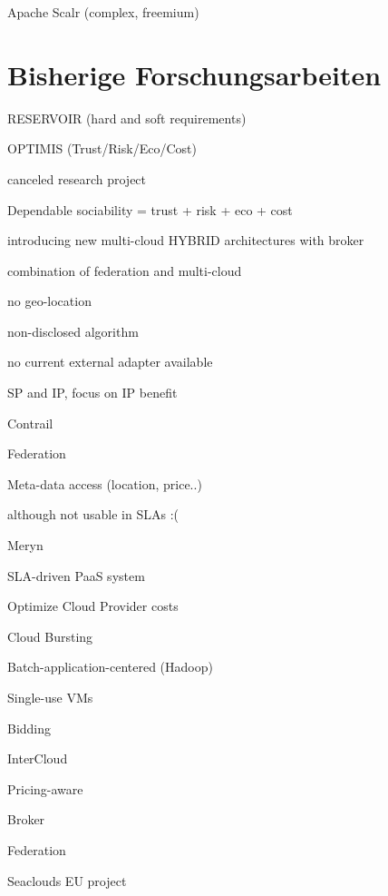 %
%
%
%
%


Apache Scalr (complex, freemium) 

\section{Bisherige Forschungsarbeiten}



RESERVOIR (hard and soft requirements) 



OPTIMIS (Trust/Risk/Eco/Cost) 

canceled research project 

Dependable sociability = trust + risk + eco + cost 

introducing new multi-cloud HYBRID architectures with broker 

combination of federation and multi-cloud 

no geo-location 

non-disclosed algorithm 

no current external adapter available 

SP and IP, focus on IP benefit 





Contrail 

Federation 

Meta-data access (location, price..) 

although not usable in SLAs  :( 



Meryn 

SLA-driven PaaS system 

Optimize Cloud Provider costs 

Cloud Bursting 

Batch-application-centered (Hadoop) 

Single-use VMs 

Bidding 



InterCloud 

Pricing-aware 

Broker 

Federation 



Seaclouds EU project 


